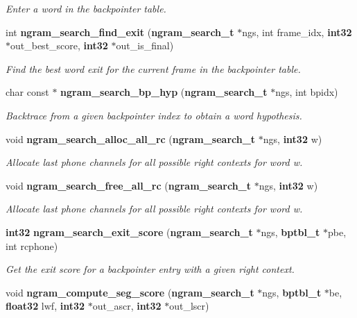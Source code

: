 \begin{DoxyCompactItemize}
\begin{DoxyCompactList}\small\item\em \-Enter a word in the backpointer table. \end{DoxyCompactList}\item 
int {\bf ngram\-\_\-search\-\_\-find\-\_\-exit} ({\bf ngram\-\_\-search\-\_\-t} $\ast$ngs, int frame\-\_\-idx, {\bf int32} $\ast$out\-\_\-best\-\_\-score, {\bf int32} $\ast$out\-\_\-is\-\_\-final)
\begin{DoxyCompactList}\small\item\em \-Find the best word exit for the current frame in the backpointer table. \end{DoxyCompactList}\item 
char const $\ast$ {\bf ngram\-\_\-search\-\_\-bp\-\_\-hyp} ({\bf ngram\-\_\-search\-\_\-t} $\ast$ngs, int bpidx)
\begin{DoxyCompactList}\small\item\em \-Backtrace from a given backpointer index to obtain a word hypothesis. \end{DoxyCompactList}\item 
void {\bf ngram\-\_\-search\-\_\-alloc\-\_\-all\-\_\-rc} ({\bf ngram\-\_\-search\-\_\-t} $\ast$ngs, {\bf int32} w)\label{ngram__search_8c_a1ddcc1a9cb3e164ceb2140097ed23a3e}

\begin{DoxyCompactList}\small\item\em \-Allocate last phone channels for all possible right contexts for word w. \end{DoxyCompactList}\item 
void {\bf ngram\-\_\-search\-\_\-free\-\_\-all\-\_\-rc} ({\bf ngram\-\_\-search\-\_\-t} $\ast$ngs, {\bf int32} w)\label{ngram__search_8c_a15477192481dffcb29e9c4167eff6c3c}

\begin{DoxyCompactList}\small\item\em \-Allocate last phone channels for all possible right contexts for word w. \end{DoxyCompactList}\item 
{\bf int32} {\bf ngram\-\_\-search\-\_\-exit\-\_\-score} ({\bf ngram\-\_\-search\-\_\-t} $\ast$ngs, {\bf bptbl\-\_\-t} $\ast$pbe, int rcphone)\label{ngram__search_8c_a25a80e488425b2bd4e24eb753c9295a5}

\begin{DoxyCompactList}\small\item\em \-Get the exit score for a backpointer entry with a given right context. \end{DoxyCompactList}\item 
void {\bfseries ngram\-\_\-compute\-\_\-seg\-\_\-score} ({\bf ngram\-\_\-search\-\_\-t} $\ast$ngs, {\bf bptbl\-\_\-t} $\ast$be, {\bf float32} lwf, {\bf int32} $\ast$out\-\_\-ascr, {\bf int32} $\ast$out\-\_\-lscr)\label{ngram__search_8c_a7526cf720a80052770c5b6f82c93749d}


\end{DoxyCompactItemize}
